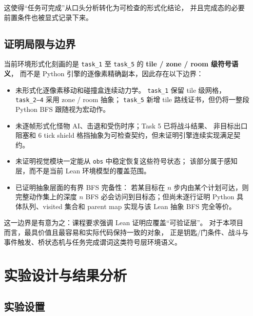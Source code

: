 \documentclass[12pt,a4paper]{ctexart}
\begin{document}
这使得“任务可完成”从口头分析转化为可检查的形式化结论，
并且完成态的必要前置条件也被显式记录下来。

\subsection{证明局限与边界}

当前环境形式化刻画的是 \texttt{task\_1} 至 \texttt{task\_5} 的
\textbf{tile / zone / room 级符号语义}，
而不是 Python 引擎的逐像素精确副本，因此存在以下边界：
\begin{itemize}[leftmargin=2em]
  \item 未形式化逐像素移动和碰撞盒连续动力学。
  \texttt{task\_1} 保留 tile 级网格，\texttt{task\_2--4} 采用 zone / room 抽象；
  \texttt{task\_5} 新增 tile 路线证书，但仍将一整段 Python BFS 跟随视为宏动作。
  \item 未逐帧形式化怪物 AI、击退和受伤时序；Task 5 已将战斗结果、
  非目标出口阻塞和 6 tick shield 格挡抽象为可检查契约，但未证明引擎连续实现满足契约。
  \item 未证明视觉模块一定能从 \texttt{obs} 中稳定恢复这些符号状态；
  该部分属于感知层，而不是当前 Lean 环境模型的覆盖范围。
  \item 已证明抽象层面的有界 BFS 完备性：
  若某目标在 \(n\) 步内由某个计划可达，则完整动作集上的深度 \(n\) BFS
  必会访问到目标态；但尚未逐行证明 Python 具体队列、visited 集合和 parent map
  实现与该 Lean 抽象 BFS 完全等价。
\end{itemize}

这一边界是有意为之：课程要求强调 Lean 证明应覆盖“可验证层”。
对于本项目而言，最具价值且最容易和实际代码保持一致的对象，
正是钥匙/门条件、战斗与事件触发、桥状态机与任务完成谓词这类符号层环境语义。

\section{实验设计与结果分析}

\subsection{实验设置}
\end{document}
